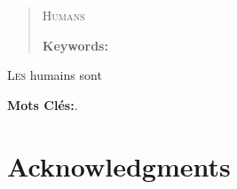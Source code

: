 


\cleardoublepage
{}
{}
\begin{abstract}

\lettrine[lines=2]{H}{umans} 

\mylineskip


\noindent\textbf{Keywords:} 
\end{abstract}

\cleardoublepage
{}
{}
\begin{resume}

\lettrine[lines=2]{L}{es} humains sont

\mylineskip

\noindent\textbf{Mots Clés:}.
\end{resume}
%

\cleardoublepage
{}
{}
\begin{dedication}
\emph{}
\end{dedication}


\chapter{Acknowledgments}
